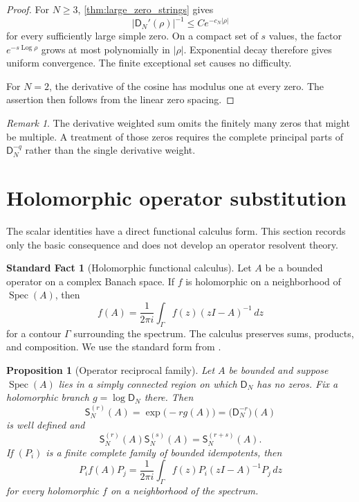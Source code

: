 \documentclass{aomart}
\newtheorem{proposition}[proposition]{Proposition}
\theoremstyle{definition}
\newtheorem{standardfact}[standardfact]{Standard Fact}
\theoremstyle{remark}
\newtheorem{remark}[remark]{Remark}
\newcommand{\Dfun}{\mathsf D}
\newcommand{\Sfun}{\mathsf S}
\newcommand{\Spec}{\operatorname{Spec}}
\newcommand{\Log}{\operatorname{Log}}
\begin{document}
\begin{proof}
For $N\geq3$, \cref{thm:large_zero_strings} gives
\[
|\Dfun_N'(\rho)|^{-1}
\leq
C e^{-c_N|\rho|}
\]
for every sufficiently large simple zero.  On a compact set of $s$ values, the factor $e^{-s\Log\rho}$ grows at most polynomially in $|\rho|$.  Exponential decay therefore gives uniform convergence.  The finite exceptional set causes no difficulty.

For $N=2$, the derivative of the cosine has modulus one at every zero.  The assertion then follows from the linear zero spacing.
\end{proof}

\begin{remark}\label{rem:multiple_zeros}
The derivative weighted sum omits the finitely many zeros that might be multiple.  A treatment of those zeros requires the complete principal parts of $\Dfun_N^{-q}$ rather than the single derivative weight.
\end{remark}

\section{Holomorphic operator substitution}\label{sec:operator_substitution}

The scalar identities have a direct functional calculus form.  This section records only the basic consequence and does not develop an operator resolvent theory.

\begin{standardfact}[Holomorphic functional calculus]\label{sf:holomorphic_calculus}
Let $A$ be a bounded operator on a complex Banach space.  If $f$ is holomorphic on a neighborhood of $\Spec(A)$, then
\[
f(A)
=
\frac1{2\pi i}\int_\Gamma f(z)(zI-A)^{-1}\,dz
\]
for a contour $\Gamma$ surrounding the spectrum.  The calculus preserves sums, products, and composition.  We use the standard form from \cite{DunfordSchwartz1958}.
\end{standardfact}

\begin{proposition}[Operator reciprocal family]\label{prop:operator_reciprocal}
Let $A$ be bounded and suppose $\Spec(A)$ lies in a simply connected region on which $\Dfun_N$ has no zeros.  Fix a holomorphic branch $g=\log\Dfun_N$ there.  Then
\[
\Sfun_N^{(r)}(A)
=
\exp\bigl(-r g(A)\bigr)
=
\bigl(\Dfun_N^{-r}\bigr)(A)
\]
is well defined and
\[
\Sfun_N^{(r)}(A)\Sfun_N^{(s)}(A)
=
\Sfun_N^{(r+s)}(A).
\]
If $(P_i)$ is a finite complete family of bounded idempotents, then
\[
P_i f(A)P_j
=
\frac1{2\pi i}
\int_\Gamma
f(z)P_i(zI-A)^{-1}P_j\,dz
\]
for every holomorphic $f$ on a neighborhood of the spectrum.
\end{proposition}
\end{document}
